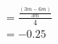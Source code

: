 \documentclass[11pt,a4j]{jarticle}
\title{}
\date{}
\begin{document}
\maketitle
\begin{align*}
    &= \frac{\frac{\left( 3 m - 6 m \right)}{3 m}}{4 } \\
    &= -0.25
\end{align*}
\end{document}
